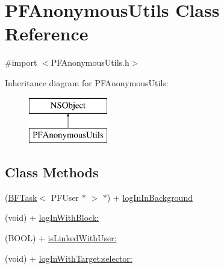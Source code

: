 \hypertarget{interface_p_f_anonymous_utils}{}\section{P\+F\+Anonymous\+Utils Class Reference}
\label{interface_p_f_anonymous_utils}


{\ttfamily \#import $<$P\+F\+Anonymous\+Utils.\+h$>$}

Inheritance diagram for P\+F\+Anonymous\+Utils\+:\begin{figure}[H]
\begin{center}
\leavevmode
\includegraphics[height=2.000000cm]{interface_p_f_anonymous_utils}
\end{center}
\end{figure}
\subsection*{Class Methods}
\begin{DoxyCompactItemize}
\item 
(\hyperlink{class_b_f_task}{B\+F\+Task}$<$ P\+F\+User $\ast$ $>$ $\ast$) + \hyperlink{interface_p_f_anonymous_utils_a54f363aeda365e07b21e1a366f941da5}{log\+In\+In\+Background}
\begin{DoxyCompactList}\small\item\em 

 \end{DoxyCompactList}\item 
(void) + \hyperlink{interface_p_f_anonymous_utils_ab165ed234df5aba9f19637564bda078a}{log\+In\+With\+Block\+:}
\item 
(B\+O\+O\+L) + \hyperlink{interface_p_f_anonymous_utils_ad3cea449ba27bf4a535a33275fd73840}{is\+Linked\+With\+User\+:}
\begin{DoxyCompactList}\small\item\em 

 \end{DoxyCompactList}\item 
(void) + \hyperlink{interface_p_f_anonymous_utils_adb7100f944decabec118d86332ca1312}{log\+In\+With\+Target\+:selector\+:}
\begin{DoxyCompactList}\small\item\em 

 \end{DoxyCompactList}\end{DoxyCompactItemize}


